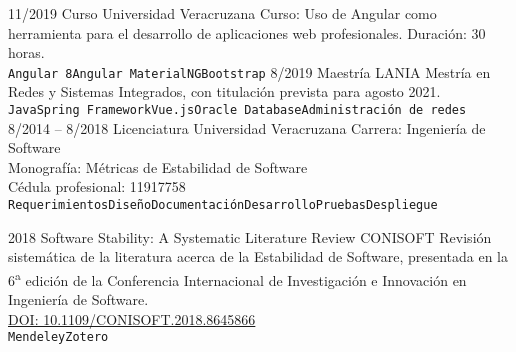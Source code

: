 \documentclass[9pt]{developercv} %
\begin{document}

\begin{entrylist}
	\entry
		{11/2019}
		{Curso}
		{Universidad Veracruzana}
        {Curso: Uso de Angular como herramienta para el desarrollo de aplicaciones web profesionales. Duración: 30 horas.\\
        \texttt{Angular 8}\slashsep\texttt{Angular Material}\slashsep\texttt{NGBootstrap}}
	\entry
		{8/2019}
		{Maestría}
		{LANIA}
        {Mestría en Redes y Sistemas Integrados, con titulación prevista para agosto 2021.\\
        \texttt{Java}\slashsep\texttt{Spring Framework}\slashsep\texttt{Vue.js}\slashsep\texttt{Oracle Database}\slashsep\texttt{Administración de redes}}
	\entry
		{8/2014 -- 8/2018}
		{Licenciatura}
		{Universidad Veracruzana}
        {Carrera: Ingeniería de Software\\
        Monografía: Métricas de Estabilidad de Software\\
        Cédula profesional: 11917758\\
        \texttt{Requerimientos}\slashsep\texttt{Diseño}\slashsep\texttt{Documentación}\slashsep\texttt{Desarrollo}\slashsep\texttt{Pruebas}\slashsep\texttt{Despliegue}}
\end{entrylist}



\begin{entrylist}
	\entry
		{2018}
		{Software Stability: A Systematic Literature Review}
		{CONISOFT}
        {Revisión sistemática de la literatura acerca de la Estabilidad de Software, presentada en la 6\textsuperscript{a} edición de la Conferencia Internacional de Investigación e Innovación en Ingeniería de Software.\\{\href{https://ieeexplore.ieee.org/document/8645866}{DOI: 10.1109/CONISOFT.2018.8645866}}\\
        \texttt{Mendeley}\slashsep\texttt{Zotero}}
\end{entrylist}



\end{document}
